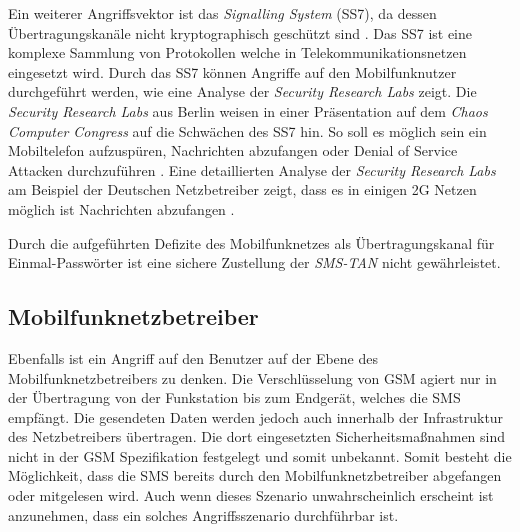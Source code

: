 \documentclass[11pt,a4paper,ngerman]{scrreprt}
\begin{document}
Ein weiterer Angriffsvektor ist das \textit{Signalling System} (SS7), da dessen Übertragungskanäle nicht kryptographisch geschützt sind \cite[S.\,202]{komSec13}. Das SS7 ist eine komplexe Sammlung von Protokollen welche in Telekommunikationsnetzen eingesetzt wird. Durch das SS7 können Angriffe auf den Mobilfunknutzer durchgeführt werden, wie eine Analyse der \textit{Security Research Labs} zeigt. Die \textit{Security Research Labs} aus Berlin weisen in einer Präsentation auf dem \textit{Chaos Computer Congress} auf die Schwächen des SS7 hin. So soll es möglich sein ein Mobiltelefon aufzuspüren, Nachrichten abzufangen oder Denial of Service Attacken durchzuführen \cite{cccMob}. Eine detaillierten Analyse der \textit{Security Research Labs} am Beispiel der Deutschen Netzbetreiber zeigt, dass es in einigen 2G Netzen möglich ist Nachrichten abzufangen \cite{srlMobSec}.

Durch die aufgeführten Defizite des Mobilfunknetzes als Übertragungskanal für Einmal-Passwörter ist eine sichere Zustellung der \textit{SMS-TAN} nicht gewährleistet.
\subsection{Mobilfunknetzbetreiber}
Ebenfalls ist ein Angriff auf den Benutzer auf der Ebene des Mobilfunknetzbetreibers zu denken. Die Verschlüsselung von GSM agiert nur in der Übertragung von der Funkstation bis zum Endgerät, welches die SMS empfängt. Die gesendeten Daten werden jedoch auch innerhalb der Infrastruktur des Netzbetreibers übertragen. Die dort eingesetzten Sicherheitsmaßnahmen sind nicht in der GSM Spezifikation festgelegt und somit unbekannt. Somit besteht die Möglichkeit, dass die SMS bereits durch den Mobilfunknetzbetreiber abgefangen oder mitgelesen wird. Auch wenn dieses Szenario unwahrscheinlich erscheint ist anzunehmen, dass ein solches Angriffsszenario durchführbar ist.
\end{document}
